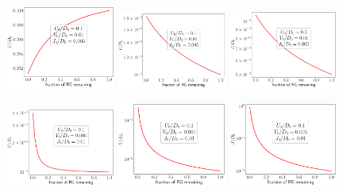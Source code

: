 \begin{figure}[htpb]
	\centering
	\includegraphics[width=0.32\textwidth]{../figures/U_irr,U>0,U.pdf}
	\includegraphics[width=0.32\textwidth]{../figures/U_irr,U>0,V.pdf}
	\includegraphics[width=0.32\textwidth]{../figures/U_irr,U>0,J.pdf}

	\includegraphics[width=0.32\textwidth]{../figures/U_rel,U>0,U.pdf}
	\includegraphics[width=0.32\textwidth]{../figures/U_rel,U>0,V.pdf}
	\includegraphics[width=0.32\textwidth]{../figures/U_rel,U>0,J.pdf}
\end{figure}

